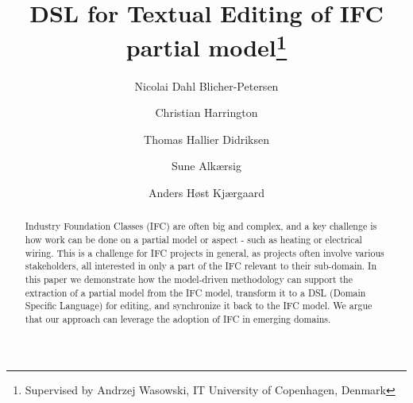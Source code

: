 \documentclass[oribibl]{llncs}
\begin{document}

\mainmatter              %
\title{DSL for Textual Editing of IFC partial model\thanks{Supervised by Andrzej Wasowski, IT University of Copenhagen, Denmark}}

\author{Nicolai Dahl Blicher-Petersen \and Christian Harrington \and
Thomas Hallier Didriksen \and Sune Alkærsig \and Anders Høst Kjærgaard\\}



\maketitle              %

\begin{abstract}
Industry Foundation Classes (IFC) are often big and complex, and a key challenge is how work can be done on a partial model or aspect - such as heating or electrical wiring. This is a challenge for IFC projects in general, as projects often involve various stakeholders, all interested in only a part of the IFC relevant to their sub-domain. In this paper we demonstrate how the model-driven methodology can support the extraction of a partial model from the IFC model, transform it to a DSL (Domain Specific Language) for editing, and synchronize it back to the IFC model. We argue that our approach can leverage the adoption of IFC in emerging domains.


\end{abstract}










\end{document}
